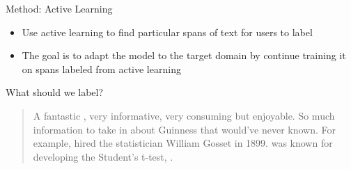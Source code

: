 \begin{frame}{Method: Active Learning}
    \begin{itemize}
        \item<1-> Use active learning to find particular spans of text for users to label
            \vfill
        \item<2-> The goal is to adapt the model to the target domain by continue
training it on spans labeled from active learning
    \end{itemize}
\end{frame}


\begin{frame}{What should we label?}
       \begin{quote}
           A fantastic , very informative, very
            consuming but enjoyable. So much information to take
           in about Guinness that  would’ve never known. For
           example,  hired the
           statistician William Gosset
           in 1899.  was known for developing
           the Student’s t-test,
           .
       \end{quote}
       \centering
       \vfill
\end{frame}



